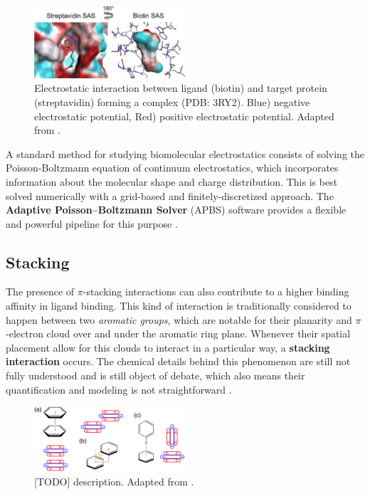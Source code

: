     \begin{figure}[H]
      \centering
      \includegraphics[width=0.5\textwidth]{figures/intro/electrostatics.png}
      \caption{\label{fig:intro/electrostatics} Electrostatic interaction between ligand (biotin) and target protein (streptavidin) forming a complex (PDB: 3RY2). Blue) negative electrostatic potential, Red) positive electrostatic potential. Adapted from \cite{electrostatics_2019}.}
    \end{figure}

    A standard method for studying biomolecular electrostatics consists of solving the Poisson-Boltzmann equation of continuum electrostatics, which incorporates information about the molecular shape and charge distribution. This is best solved numerically with a grid-based and finitely-discretized approach. The \textbf{Adaptive Poisson–Boltzmann Solver} (APBS) software provides a flexible and powerful pipeline for this purpose \cite{apbs_2004, apbs_2018, apbs_web}.

  \subsection{Stacking}
    The presence of $\pi$-stacking interactions can also contribute to a higher binding affinity in ligand binding. This kind of interaction is traditionally considered to happen between two \textit{aromatic groups}, which are notable for their planarity and $\pi$-electron cloud over and under the aromatic ring plane. Whenever their spatial placement allow for this clouds to interact in a particular way, a \textbf{stacking interaction} occurs. The chemical details behind this phenomenon are still not fully understood and is still object of debate, which also means their quantification and modeling is not straightforward \cite{stacking_binding_2020, stacking_trp_2022, stacking_general_2020}.

    \begin{figure}[H]
      \centering
      \includegraphics[width=0.5\textwidth]{figures/intro/stacking_configs.png}
      \caption{\label{fig:intro/stacking_configs} [TODO] description. Adapted from \cite{stacking_general_2020}.}
    \end{figure}

